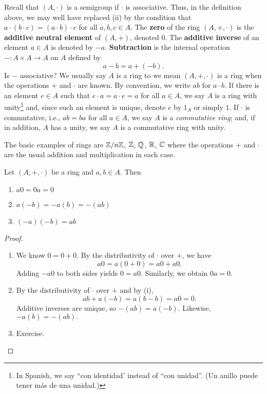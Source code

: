 \documentclass[11pt,a4paper]{article}
\begin{document}
%
Recall that  $(A,\cdot)$ is a semigroup if \(\cdot\) is associative.
Thus, in the definition above, we may well have replaced (ii) by the condition that \(a\cdot(b\cdot c) = (a \cdot b)\cdot c\) for all \(a,b,c\in A\).
The \textbf{zero} of the ring \((A,+,\cdot)\) is the  \textbf{additive neutral element} of $(A,+)$, denoted $0$.
The \textbf{additive inverse} of an element $a\in A$ is denoted by $-a$.
\textbf{Subtraction} is the internal operation \(-\colon A\times A\to A\) on $A$ defined by
\[
a-b = a+(-b).
\]
Is \(-\) associative?
We usually say \(A\) is a ring to we mean \((A,+,\cdot)\) is a ring when the operations \(+\) and \(\cdot\) are known.
By convention, we write $ab$ for  $a\cdot b$.
If there is an element \(e\in A\) such that \(e \cdot a = a \cdot e = a\) for all \(a\in A\), we say \(A\) is a ring with unity\footnote{In Spanish, we say ``con identidad' instead of ``con unidad''. (Un anillo puede tener más de una unidad.)}
and, since such an element is unique,  denote  \(e\) by \(1_A\) or simply \(1\). 
If \(\cdot\) is commutative, i.e., \(ab = ba\) for all \(a\in A\), we say \(A\) is a \textit{commutative ring}; and, if in addition, \(A\) has a unity, we say \(A\) is a commutative ring with unity.




%



\begin{exa}
    The basic examples of rings are \(\mathbb{Z}/n\mathbb{Z}\), $\mathbb{Z}$, $\mathbb{Q}$, $\mathbb{R}$, $\mathbb{C}$ where the operations $+$ and $\cdot$ are the usual addition and multiplication in each case.
\end{exa}
 
\begin{teo}
Let $(A,+,\cdot)$ be a ring and
$a,b \in A$. Then 
\begin{enumerate}[label=(\roman*)]
    \item \(a 0 = 0 a = 0\)
    \item \(a (-b) = -a (b) = -(a b)\)
    \item \((-a)(-b) = a b\)
\end{enumerate}
\end{teo} 

\begin{proof}
\begin{enumerate}[label=(\roman*)]
    \item We know \(0 = 0 + 0\). By the distributivity of \(\cdot\) over \(+\), we have  
    \[
    a 0=a (0+0)=a 0+a 0.
    \]
    Adding \(-a0\) to both sides yields \(0=a0\). 
    Similarly, we obtain \(0a=0\). 
\item By the distributivity of \(\cdot\) over \(+\) and by (i), 
    \[a b+a(-b)=a (b-b) = a0=0.\]
    Additive inverses are unique, so \(-(a b)=a (-b)\). 
    Likewise, \(-a (b)=-(a b).\)
    \item Exercise.
\end{enumerate}
\end{proof}
\end{document}
